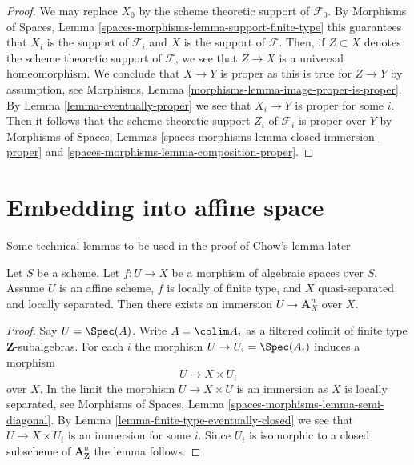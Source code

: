 \begin{proof}
We may replace $X_0$ by the scheme theoretic support of $\mathcal{F}_0$.
By Morphisms of Spaces, Lemma \ref{spaces-morphisms-lemma-support-finite-type}
this guarantees that $X_i$ is the support of $\mathcal{F}_i$ and $X$ is the
support of $\mathcal{F}$. Then, if $Z \subset X$ denotes the scheme
theoretic support of $\mathcal{F}$, we see that $Z \to X$ is a universal
homeomorphism. We conclude that $X \to Y$ is proper as this is true for
$Z \to Y$ by assumption, see
Morphisms, Lemma \ref{morphisms-lemma-image-proper-is-proper}.
By Lemma \ref{lemma-eventually-proper} we see that $X_i \to Y$ is proper
for some $i$. Then it follows that the scheme theoretic support $Z_i$ of
$\mathcal{F}_i$ is proper over $Y$ by
Morphisms of Spaces, Lemmas
\ref{spaces-morphisms-lemma-closed-immersion-proper} and
\ref{spaces-morphisms-lemma-composition-proper}.
\end{proof}








\section{Embedding into affine space}
\label{section-embedding}

\noindent
Some technical lemmas to be used in the proof of Chow's lemma later.

\begin{lemma}
\label{lemma-embedding-into-affine-over-ls-qs}
Let $S$ be a scheme. Let $f : U \to X$ be a morphism of algebraic
spaces over $S$. Assume $U$ is an affine scheme, $f$ is locally of
finite type, and $X$ quasi-separated and locally separated.
Then there exists an immersion $U \to \mathbf{A}^n_X$ over $X$.
\end{lemma}

\begin{proof}
Say $U = \Spec(A)$. Write $A = \colim A_i$ as a filtered colimit
of finite type $\mathbf{Z}$-subalgebras. For each $i$ the morphism
$U \to U_i = \Spec(A_i)$ induces a morphism
$$
U \longrightarrow X \times U_i
$$
over $X$. In the limit the morphism $U \to X \times U$ is an immersion
as $X$ is locally separated, see
Morphisms of Spaces, Lemma
\ref{spaces-morphisms-lemma-semi-diagonal}.
By Lemma \ref{lemma-finite-type-eventually-closed}
we see that $U \to X \times U_i$ is an immersion for some $i$.
Since $U_i$ is isomorphic to a closed subscheme of
$\mathbf{A}^n_{\mathbf{Z}}$ the lemma follows.
\end{proof}


